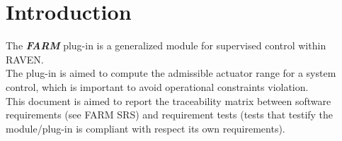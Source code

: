 \section{Introduction}
The \textbf{\textit{FARM}} plug-in is a generalized module for supervised control within RAVEN.
\\The plug-in is aimed to compute the admissible actuator range for a system control, which is 
important to avoid operational constraints violation.
\\This document is aimed to report the traceability matrix between software requirements
(see FARM SRS) and requirement tests (tests that testify the module/plug-in is compliant
with respect its own requirements).
